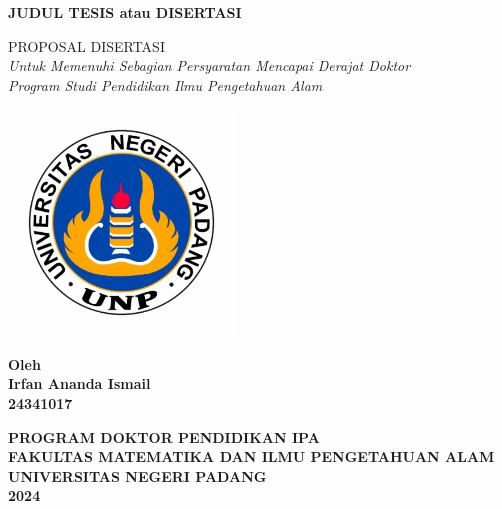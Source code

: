 \begin{titlepage}
  \begin{center}
      
      \Large
        \textbf{JUDUL TESIS atau DISERTASI}
                
        \vspace{2.0cm} %
                 
        \large
        PROPOSAL DISERTASI \\ \small
        \textit{Untuk Memenuhi Sebagian Persyaratan Mencapai Derajat Doktor \\
            Program Studi Pendidikan Ilmu Pengetahuan Alam}           
        \vfill
            
        \includegraphics[width=6.0cm]{front/logo-unp.png}
            
        \vfill
        \large
        \textbf{Oleh} \\
        \textbf{Irfan Ananda Ismail} \\
        \textbf{24341017}
            
        \vfill
            
        \large
        \textbf{PROGRAM DOKTOR PENDIDIKAN IPA \\
        FAKULTAS MATEMATIKA DAN ILMU PENGETAHUAN ALAM\\
        UNIVERSITAS NEGERI PADANG \\
        2024}
      
  \end{center}
\end{titlepage}